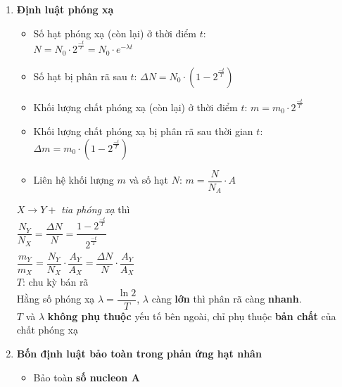 \documentclass[a4paper,12pt,titlepage,twocolumn]{article}
\newenvironment{myitemize} 
{ \begin{itemize}[leftmargin=*,label=-]  %
		\setlength{\itemsep}{0pt}
		\setlength{\parskip}{0pt}
		\setlength{\parsep}{0pt}     }
{ \end{itemize}                  }
\newenvironment{myenumerate}
{ \begin{enumerate}[label=\textbf{\arabic*}.]
\setlist{nolistsep} %
\setlength{\itemsep}{0pt}
\setlength{\parskip}{0pt}
\setlength{\parsep}{0pt}	}
{ \end{enumerate}}
\begin{document}
\begin{myenumerate}
\begin{myitemize}
	\end{myitemize}
	\textit{Lưu ý: Tia $\mathit{\alpha,\beta}$ \textbf{lệch} trong điện trường và từ trường, còn tia $\mathit{\gamma}$ thì \textbf{không lệch}}
	\item \textbf{Định luật phóng xạ}
	\begin{adjustwidth}{-0.5cm}{}
		\begin{myitemize}
			\item Số hạt phóng xạ (còn lại) ở thời điểm $t$: \\ 
			$N = N_0 \cdot 2^{\tfrac{-t}{T}}_{\phantom{i}} = N_0 \cdot e^{-\lambda t}$ %
			\item Số hạt bị phân rã sau $t$: $\Delta N = N_0 \cdot (1-2^{\tfrac{-t}{T}}_{\phantom{i}})$
			\item Khối lượng chất phóng xạ (còn lại) ở thời điểm $t$: $m = m_0 \cdot 2^{\tfrac{-t}{T}}_{\phantom{i}}$
			\item Khối lượng chất phóng xạ bị phân rã sau thời gian $t$: $\Delta m = m_0 \cdot (1-2^{\tfrac{-t}{T}}_{\phantom{i}})$
			\item Liên hệ khối lượng $m$ và số hạt $N$: $m = \dfrac{N}{N_A} \cdot A$
		\end{myitemize}
	\end{adjustwidth}
	$X \rightarrow Y +$ \textit{tia phóng xạ} thì \\
	$\dfrac{N_Y}{N_X} = \dfrac{\Delta N}{N} = \dfrac{1-2^{\tfrac{-t}{T}}_{\phantom{i}}}{2^{\tfrac{-t}{T}}_{\phantom{i}}}$ \\
	$\dfrac{m_Y}{m_X} = \dfrac{N_Y}{N_X} \cdot \dfrac{A_Y}{A_X} = \dfrac{\Delta N}{N} \cdot \dfrac{A_Y}{A_X}$ \\
	$T$: chu kỳ bán rã \\
	Hằng số phóng xạ $\lambda = \dfrac{\ln 2}{T}$, $\lambda$ càng \textbf{lớn} thì phân rã càng \textbf{nhanh}. \\
	$T$ và $\lambda$ \textbf{không phụ thuộc} yếu tố bên ngoài, chỉ phụ thuộc \textbf{bản chất} của chất phóng xạ
	\item \textbf{Bốn định luật bảo toàn trong phản ứng hạt nhân}
	\begin{myitemize}
		\item Bảo toàn \textbf{số nucleon A}

\end{myitemize}
\end{myenumerate}
\end{document}
